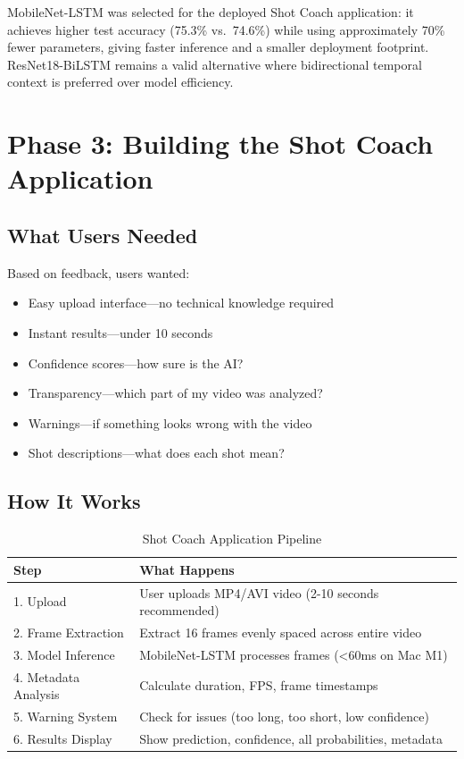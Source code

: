\documentclass[11pt,a4paper]{article}
\begin{document}
MobileNet-LSTM was selected for the deployed Shot Coach application: it achieves higher test accuracy (75.3\% vs.\ 74.6\%) while using approximately 70\% fewer parameters, giving faster inference and a smaller deployment footprint. ResNet18-BiLSTM remains a valid alternative where bidirectional temporal context is preferred over model efficiency.

\section{Phase 3: Building the Shot Coach Application}

\subsection{What Users Needed}

Based on feedback, users wanted:
\begin{itemize}
\item Easy upload interface---no technical knowledge required
\item Instant results---under 10 seconds
\item Confidence scores---how sure is the AI?
\item Transparency---which part of my video was analyzed?
\item Warnings---if something looks wrong with the video
\item Shot descriptions---what does each shot mean?
\end{itemize}

\subsection{How It Works}

\begin{table}[H]
\centering
\caption{Shot Coach Application Pipeline}
\begin{tabular}{p{3cm}p{9cm}}
\toprule
\textbf{Step} & \textbf{What Happens} \\
\midrule
1. Upload & User uploads MP4/AVI video (2-10 seconds recommended) \\
2. Frame Extraction & Extract 16 frames evenly spaced across entire video \\
3. Model Inference & MobileNet-LSTM processes frames (\textless{}60ms on Mac M1) \\
4. Metadata Analysis & Calculate duration, FPS, frame timestamps \\
5. Warning System & Check for issues (too long, too short, low confidence) \\
6. Results Display & Show prediction, confidence, all probabilities, metadata \\
\bottomrule
\end{tabular}
\end{table}
\end{document}
